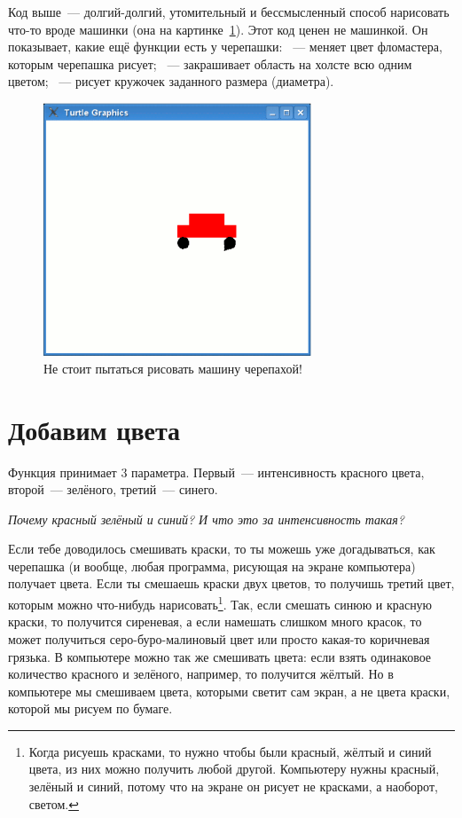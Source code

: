 Код выше — долгий-долгий, утомительный и бессмысленный способ нарисовать что-то вроде машинки (она на картинке \ref{fig24}). Этот код ценен не машинкой. Он показывает, какие ещё функции есть у черепашки:  — меняет цвет фломастера, которым черепашка рисует;  — закрашивает область на холсте всю одним цветом;  — рисует кружочек заданного размера (диаметра).

\begin{figure}
\begin{center}
\includegraphics[width=80mm]{../en/figure24.eps}
\end{center}
\caption{Не стоит пытаться рисовать машину черепахой!}\label{fig24}
\end{figure}

\section{Добавим цвета}

Функция  принимает 3 параметра. Первый — интенсивность красного цвета, второй — зелёного, третий — синего.

\emph{Почему красный зелёный и синий? И что это за интенсивность такая?}

Если тебе доводилось смешивать краски, то ты можешь уже догадываться, как черепашка (и вообще, любая программа, рисующая на экране компьютера) получает цвета. Если ты смешаешь краски двух цветов, то получишь третий цвет, которым можно что-нибудь нарисовать\footnote{Когда рисуешь красками, то нужно чтобы были красный, жёлтый и синий цвета, из них можно получить любой другой. Компьютеру нужны красный, зелёный и синий, потому что на экране он рисует не красками, а наоборот, светом.}. Так, если смешать синюю и красную краски, то получится сиреневая, а если намешать слишком много красок, то может получиться серо-буро-малиновый цвет или просто какая-то коричневая грязька. В компьютере можно так же смешивать цвета: если взять одинаковое количество красного и зелёного, например, то получится жёлтый. Но в компьютере мы смешиваем цвета, которыми светит сам экран, а не цвета краски, которой мы рисуем по бумаге.

